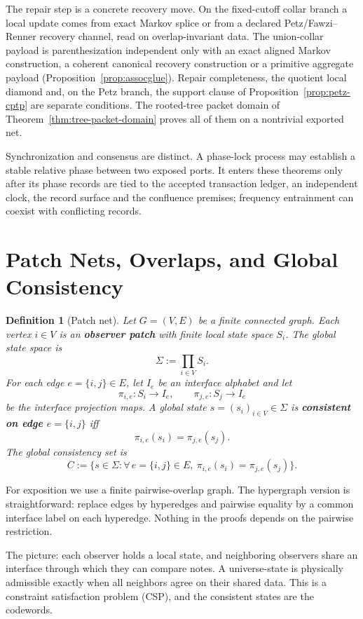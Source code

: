 \documentclass[11pt]{article}
\newtheorem{definition}[theorem]{Definition}
\theoremstyle{remark}
\theoremstyle{plain}
\begin{document}
The repair step is a concrete recovery move. On the fixed-cutoff collar
branch a local update comes from exact Markov splice or from a declared
Petz/Fawzi--Renner recovery channel, read on overlap-invariant data. The
union-collar payload is parenthesization independent only with an exact
aligned Markov construction, a coherent canonical recovery construction or
a primitive aggregate payload (Proposition~\ref{prop:assocglue}). Repair
completeness, the quotient local diamond and, on the Petz branch, the
support clause of Proposition~\ref{prop:petz-cptp} are separate conditions.
The rooted-tree packet domain of Theorem~\ref{thm:tree-packet-domain}
proves all of them on a nontrivial exported net.

Synchronization and consensus are distinct. A phase-lock process may
establish a stable relative phase between two exposed ports. It enters
these theorems only after its phase records are tied to the accepted
transaction ledger, an independent clock, the record surface and the
confluence premises; frequency entrainment can coexist with conflicting
records.

\section{Patch Nets, Overlaps, and Global Consistency}

\begin{definition}[Patch net]\label{def:patchnet}
Let $G=(V,E)$ be a finite connected graph. Each vertex $i\in V$ is an \textbf{observer patch} with finite local state space $S_i$. The global state space is
\[
\Sigma := \prod_{i\in V} S_i.
\]
For each edge $e=\{i,j\}\in E$, let $I_e$ be an interface alphabet and let
\[
\pi_{i,e}:S_i\to I_e,
\qquad
\pi_{j,e}:S_j\to I_e
\]
be the interface projection maps. A global state $s=(s_i)_{i\in V}\in\Sigma$ is \textbf{consistent on edge $e=\{i,j\}$} iff
\[
\pi_{i,e}(s_i)=\pi_{j,e}(s_j).
\]
The global consistency set is
\[
C:=\bigl\{s\in\Sigma:\forall\, e=\{i,j\}\in E,\ \pi_{i,e}(s_i)=\pi_{j,e}(s_j)\bigr\}.
\]
\end{definition}

For exposition we use a finite pairwise-overlap graph. The hypergraph version is straightforward: replace edges by hyperedges and pairwise equality by a common interface label on each hyperedge. Nothing in the proofs depends on the pairwise restriction.

The picture: each observer holds a local state, and neighboring observers share an interface through which they can compare notes. A universe-state is physically admissible exactly when all neighbors agree on their shared data. This is a constraint satisfaction problem (CSP), and the consistent states are the codewords.
\end{document}
